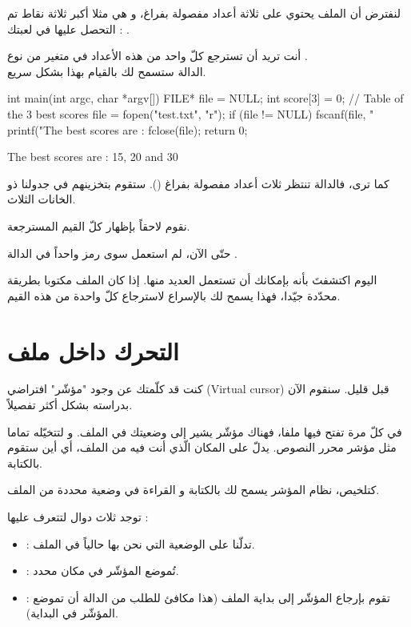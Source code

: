 لنفترض أن الملف يحتوي على ثلاثة أعداد مفصولة بفراغ، و هي مثلا أكبر ثلاثة نقاط تم التحصل عليها في لعبتك :
.

أنت تريد أن تسترجع كلّ واحد من هذه الأعداد في متغير من نوع
.\\
الدالة
ستسمح لك بالقيام بهذا بشكل سريع.

\begin{Csource}
int main(int argc, char *argv[])
{
  FILE* file = NULL;
  int score[3] = {0}; // Table of the 3 best scores
  file = fopen("test.txt", "r");
  if (file != NULL)
  {
    fscanf(file, "%
    printf("The best scores are : %
    fclose(file);
  }
  return 0;
}
\end{Csource}

\begin{Console}
The best scores are : 15, 20 and 30
\end{Console}

كما ترى، فالدالة
تنتظر ثلاث أعداد مفصولة بفراغ
().
ستقوم بتخزينهم في جدولنا ذو الخانات الثلاث.

نقوم لاحقاً بإظهار كلّ القيم المسترجعة.

\begin{information}
حتّى الآن، لم استعمل سوى رمز
واحداً في الدالة
.

اليوم اكتشفتَ بأنه بإمكانك أن تستعمل العديد منها. إذا كان الملف مكتوبا بطريقة محدّدة جيّدا، فهذا يسمح لك بالإسراع لاسترجاع كلّ واحدة من هذه القيم.
\end{information}

\section{التحرك داخل ملف}

كنت قد كلّمتك عن وجود "مؤشّر" افتراضي
(\textenglish{Virtual cursor})
قبل قليل.
سنقوم الآن بدراسته بشكل أكثر تفصيلاً.

في كلّ مرة تفتح فيها ملفا، فهناك مؤشّر يشير إلى وضعيتك في الملف. و لتتخيّله تماما مثل مؤشر محرر النصوص. يدلّ على المكان الّذي أنت فيه من الملف، أي أين ستقوم بالكتابة.

كتلخيص، نظام المؤشر يسمح لك بالكتابة و القراءة في وضعية محددة من الملف.

توجد ثلاث دوال لتتعرف عليها :

\begin{itemize}
  \item {} :
  تدلّنا على الوضعية التي نحن بها حالياً في الملف.
  \item {} :
  تُموضع المؤشّر في مكان محدد.
  \item {} :
  تقوم بإرجاع المؤشّر إلى بداية الملف (هذا مكافئ للطلب من الدالة
  أن تموضع المؤشّر في البداية).
\end{itemize}

